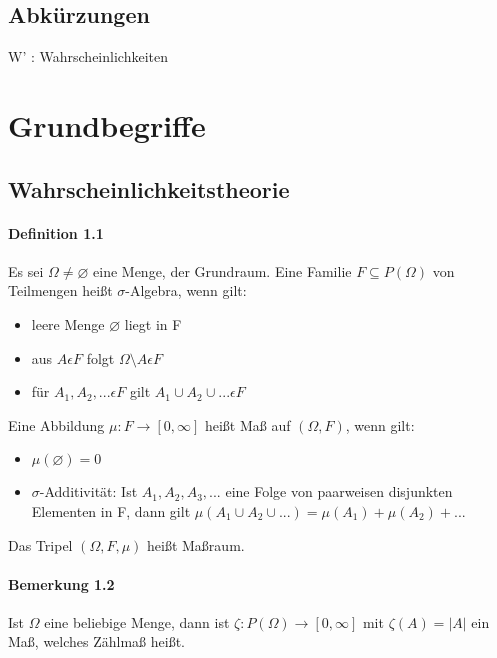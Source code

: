 \documentclass[paper=a4, fontsize=11pt]{scrartcl}
\numberwithin{equation}{section}
\numberwithin{figure}{section}
\numberwithin{table}{section}
\begin{document}
\subsection{Abkürzungen}
W' : Wahrscheinlichkeiten

\newpage
\section{Grundbegriffe}
\subsection{Wahrscheinlichkeitstheorie}
\paragraph{Definition 1.1}
Es sei $ \Omega \neq \varnothing$ eine Menge, der Grundraum. Eine Familie $F \subseteq P( \Omega)$ von Teilmengen heißt $ \sigma$-Algebra, wenn gilt:

\begin{itemize}
\item leere Menge $ \varnothing$ liegt in F
\item aus $A \epsilon F$ folgt $ \Omega \setminus A \epsilon F$
\item für $A_{1}, A_{2}, ... \epsilon F$ gilt $A_{1} \cup A_{2} \cup ... \epsilon F$
\end{itemize}

Eine Abbildung $\mu : F \rightarrow [0, \infty ]$ heißt Maß auf $(\Omega, F)$, wenn gilt:

\begin{itemize}
\item $\mu (\varnothing) = 0$
\item $\sigma$-Additivität: Ist $A_{1}, A_{2},A_{3},... $ eine Folge von paarweisen disjunkten Elementen in F, dann gilt $\mu (A_{1} \cup A_{2} \cup ...) = \mu  (A_{1}) + \mu (A_{2}) + ...$ 
\end{itemize}

Das Tripel $( \Omega, F, \mu)$ heißt Maßraum.

\paragraph{Bemerkung 1.2}
Ist $\Omega$ eine beliebige Menge, dann ist $\zeta : P(\Omega) \rightarrow [0, \infty ]$ mit $\zeta (A) = |A| $ ein Maß, welches Zählmaß heißt.
\end{document}
